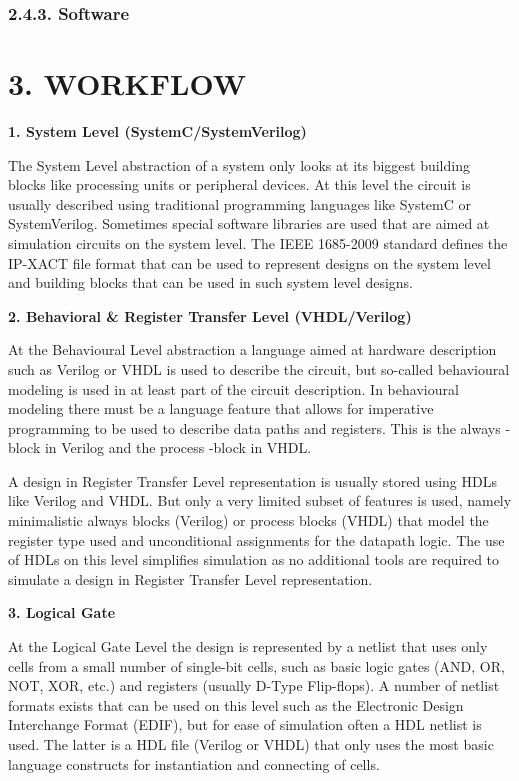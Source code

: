 \documentclass[]{article}
\begin{document}
\subsubsection{2.4.3. Software}\label{software}

\section{3. WORKFLOW}\label{workflow}

\textbf{1. System Level (SystemC/SystemVerilog)}

The System Level abstraction of a system only looks at its biggest
building blocks like processing units or peripheral devices. At this
level the circuit is usually described using traditional programming
languages like SystemC or SystemVerilog. Sometimes special software
libraries are used that are aimed at simulation circuits on the system
level. The IEEE 1685-2009 standard defines the IP-XACT file format that
can be used to represent designs on the system level and building blocks
that can be used in such system level designs.

\textbf{2. Behavioral \& Register Transfer Level (VHDL/Verilog)}

At the Behavioural Level abstraction a language aimed at hardware
description such as Verilog or VHDL is used to describe the circuit, but
so-called behavioural modeling is used in at least part of the circuit
description. In behavioural modeling there must be a language feature
that allows for imperative programming to be used to describe data paths
and registers. This is the always -block in Verilog and the process
-block in VHDL.

A design in Register Transfer Level representation is usually stored
using HDLs like Verilog and VHDL. But only a very limited subset of
features is used, namely minimalistic always blocks (Verilog) or process
blocks (VHDL) that model the register type used and unconditional
assignments for the datapath logic. The use of HDLs on this level
simplifies simulation as no additional tools are required to simulate a
design in Register Transfer Level representation.

\textbf{3. Logical Gate}

At the Logical Gate Level the design is represented by a netlist that
uses only cells from a small number of single-bit cells, such as basic
logic gates (AND, OR, NOT, XOR, etc.) and registers (usually D-Type
Flip-flops). A number of netlist formats exists that can be used on this
level such as the Electronic Design Interchange Format (EDIF), but for
ease of simulation often a HDL netlist is used. The latter is a HDL file
(Verilog or VHDL) that only uses the most basic language constructs for
instantiation and connecting of cells.
\end{document}
